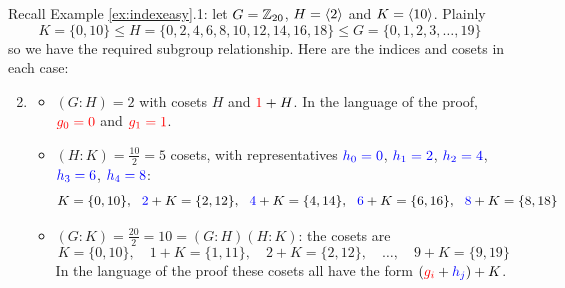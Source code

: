 \begin{examples}{}{}
	\exstart Recall Example \ref{ex:indexeasy}.1: let $G=\mathbb{Z}_{20}$, $H=\left\langle 2\right\rangle$ and $K=\left\langle 10\right\rangle$. Plainly
	\[
		K=\{0,10\}
		\le H=\{0,2,4,6,8,10,12,14,16,18\}
		\le G=\{0,1,2,3,\ldots,19\}
	\]
	so we have the required subgroup relationship. Here are the indices and cosets in each case:
		
	\begin{enumerate}\setcounter{enumi}{1}
	  \item[]\begin{itemize}
		  \item $(G:H)=2$ with cosets $H$ and $\textcolor{red}{1}+H$. In the language of the proof, $\textcolor{red}{g_0=0}$ and $\textcolor{red}{g_1=1}$.
		  \item $(H:K)=\frac{10}{2}=5$ cosets, with representatives $\textcolor{blue}{h_0=0}$, $\textcolor{blue}{h_1=2}$, $\textcolor{blue}{h_2=4}$, $\textcolor{blue}{h_3=6}$, $\textcolor{blue}{h_4=8}$:
			\[
				K=\{0,10\},\ \ \textcolor{blue}{2}+K=\{2,12\},\ \ \textcolor{blue}{4}+K=\{4,14\},\ \ \textcolor{blue}{6}+K=\{6,16\},\ \ \textcolor{blue}{8}+K=\{8,18\}
			\]
			\item $(G:K)=\frac{20}{2}=10=(G:H)(H:K)$: the cosets are
			\[
				K=\{0,10\},\quad 
				1+K=\{1,11\},\quad 
				2+K=\{2,12\},\quad 
				\ldots ,\quad 
				9+K=\{9,19\}
			\]
			In the language of the proof these cosets all have the form $(\textcolor{red}{g_i}+\textcolor{blue}{h_j})+K$.
		\end{itemize}
	

\end{enumerate}
\end{examples}
